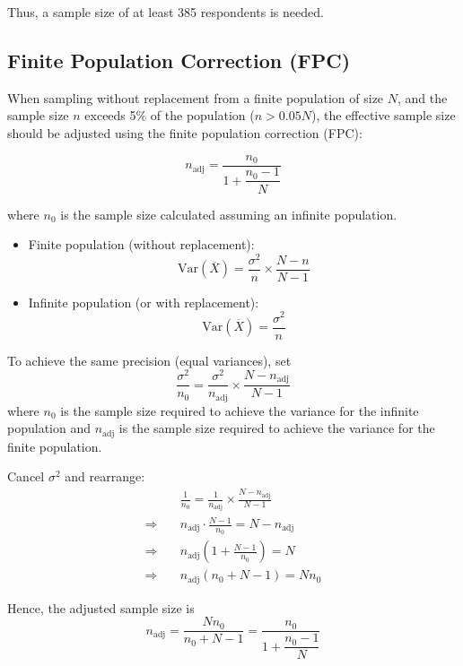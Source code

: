 \documentclass[twoside]{book}
\begin{document}
Thus, a sample size of at least 385 respondents is needed.

\subsection{Finite Population Correction (FPC)}

When sampling without replacement from a finite population of size \(N\), and the sample size \(n\) exceeds 5\% of the population (\(n > 0.05N\)), the effective sample size should be adjusted using the finite population correction (FPC):

\[
n_{\text{adj}} = \dfrac{n_0}{1 + \dfrac{n_0 - 1}{N}}
\]

where \(n_0\) is the sample size calculated assuming an infinite population.

\medskip

\begin{itemize}
	\item {Finite population (without replacement):}
	\[
	\mathrm{Var}(\overline{X}) = \frac{\sigma^2}{n} \times \frac{N - n}{N - 1}
	\]
	\item {Infinite population (or with replacement):}
	\[
	\mathrm{Var}(\overline{X}) = \frac{\sigma^2}{n}
	\]
\end{itemize}

\medskip

To achieve the same precision (equal variances), set
\[
\frac{\sigma^2}{n_0} = \frac{\sigma^2}{n_{\text{adj}}} \times \frac{N - n_{\text{adj}}}{N - 1}
\]
where $n_0$ is the sample size required to achieve the variance for the infinite population and $n_{\text{adj}}$ is the sample size required to achieve the variance for the finite population.

Cancel \(\sigma^2\) and rearrange:
\begin{align*}
&\frac{1}{n_0} = \frac{1}{n_{\text{adj}}} \times \frac{N - n_{\text{adj}}}{N - 1} \\[6pt]
\Rightarrow \quad &n_{\text{adj}} \cdot \frac{N - 1}{n_0} = N - n_{\text{adj}}\\
\Rightarrow \quad &n_{\text{adj}} \left( 1 + \frac{N - 1}{n_0} \right) = N\\
\Rightarrow \quad &n_{\text{adj}} (n_0 + N - 1) = N n_0
\end{align*}

Hence, the adjusted sample size is
\[
	n_{\text{adj}} = \dfrac{N n_0}{n_0 + N - 1} = \dfrac{n_0}{1 + \dfrac{n_0 - 1}{N}}
\]
\end{document}
